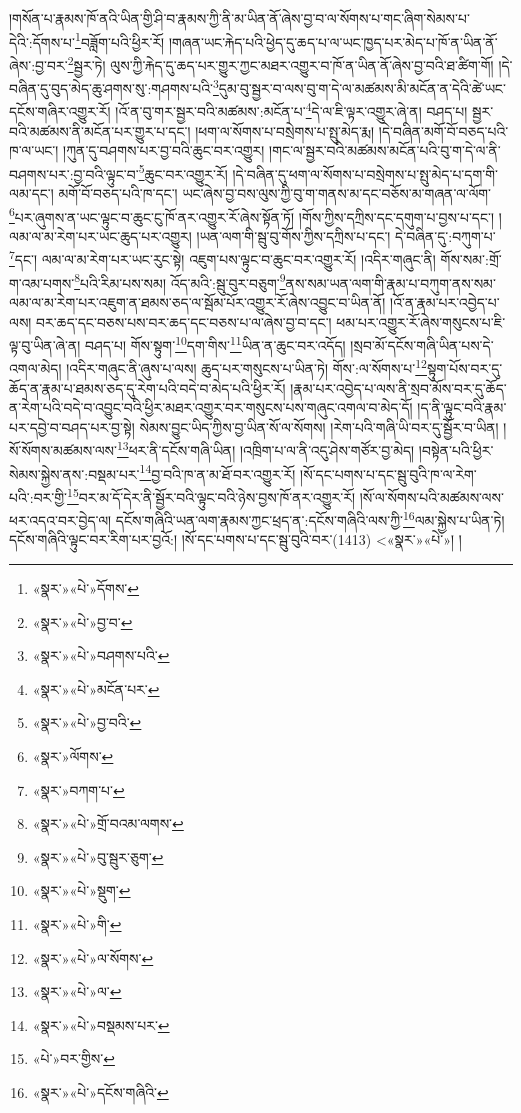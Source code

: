 །གསོན་པ་རྣམས་ཁོ་ནའི་ཡིན་གྱི་ཤི་བ་རྣམས་ཀྱི་ནི་མ་ཡིན་ནོ་ཞེས་བྱ་བ་ལ་སོགས་པ་གང་ཞིག་སེམས་པ་དེའི་:དོགས་པ་\footnote{«སྣར་»«པེ་»དོགས་}བཟློག་པའི་ཕྱིར་རོ། །གཞན་ཡང་རྐེད་པའི་ཕྱེད་དུ་ཆད་པ་ལ་ཡང་ཁྱད་པར་མེད་པ་ཁོ་ན་ཡིན་ནོ་ཞེས་:བྱ་བར་\footnote{«སྣར་»«པེ་»བྱ་བ་}སྦྱར་ཏེ། ལུས་ཀྱི་རྐེད་དུ་ཆད་པར་གྱུར་ཀྱང་མཐར་འགྱུར་བ་ཁོ་ན་ཡིན་ནོ་ཞེས་བྱ་བའི་ཐ་ཚིག་གོ། །དེ་བཞིན་དུ་བུད་མེད་ཆུ་ཤགས་སུ་:གཤགས་པའི་\footnote{«སྣར་»«པེ་»བཤགས་པའི་}དུམ་བུ་སྦྱར་བ་ལས་བུ་ག་དེ་ལ་མཚམས་མི་མངོན་ན་དེའི་ཚེ་ཡང་དངོས་གཞིར་འགྱུར་རོ། །འོ་ན་བུ་གར་སྦྱར་བའི་མཚམས་:མངོན་པ་\footnote{«སྣར་»«པེ་»མངོན་པར་}དེ་ལ་ཇི་ལྟར་འགྱུར་ཞེ་ན། བཤད་པ། སྦྱར་བའི་མཚམས་ནི་མངོན་པར་གྱུར་པ་དང་། །ཕག་ལ་སོགས་པ་བསྲེགས་པ་སྤུ་མེད་རྨ། །དེ་བཞིན་མགོ་བོ་བཅད་པའི་ཁ་ལ་ཡང་། །ཀུན་དུ་བཤགས་པར་བྱ་བའི་ཆུང་བར་འགྱུར། །གང་ལ་སྦྱར་བའི་མཚམས་མངོན་པའི་བུ་ག་དེ་ལ་ནི་བཤགས་པར་:བྱ་བའི་ལྟུང་བ་\footnote{«སྣར་»«པེ་»བྱ་བའི་}ཆུང་བར་འགྱུར་རོ། །དེ་བཞིན་དུ་ཕག་ལ་སོགས་པ་བསྲེགས་པ་སྤུ་མེད་པ་དག་གི་ལམ་དང་། མགོ་བོ་བཅད་པའི་ཁ་དང་། ཡང་ཞེས་བྱ་བས་ལུས་ཀྱི་བུ་ག་གནས་མ་དང་བཅོས་མ་གཞན་ལ་ལོག་\footnote{«སྣར་»ལོགས་}པར་ཞུགས་ན་ཡང་ལྟུང་བ་ཆུང་ངུ་ཁོ་ནར་འགྱུར་རོ་ཞེས་སྟོན་ཏོ། །གོས་ཀྱིས་དཀྲིས་དང་དགུག་པ་བྱས་པ་དང་། །ལམ་ལ་མ་རེག་པར་ཡང་ཆུད་པར་འགྱུར། །ཡན་ལག་གི་སྦུ་བུ་གོས་ཀྱིས་དཀྲིས་པ་དང་། དེ་བཞིན་དུ་:བཀུག་པ་\footnote{«སྣར་»བཀག་པ་}དང་། ལམ་ལ་མ་རེག་པར་ཡང་རུང་སྟེ། འཇུག་པས་ལྟུང་བ་ཆུང་བར་འགྱུར་རོ། །འདིར་གཞུང་ནི། གོས་སམ་:གྲོ་ག་འམ་པགས་\footnote{«སྣར་»«པེ་»གྲོ་བའམ་ལགས་}པའི་རིམ་པས་སམ། འོད་མའི་:སྦུ་བུར་བཅུག་\footnote{«སྣར་»«པེ་»བུ་སྦུར་ཅུག་}ནས་སམ་ཡན་ལག་གི་རྣམ་པ་བཀུག་ནས་སམ་ལམ་ལ་མ་རེག་པར་འཇུག་ན་ཐམས་ཅད་ལ་སྦོམ་པོར་འགྱུར་རོ་ཞེས་འབྱུང་བ་ཡིན་ནོ། །འོ་ན་རྣམ་པར་འབྱེད་པ་ལས། བར་ཆད་དང་བཅས་པས་བར་ཆད་དང་བཅས་པ་ལ་ཞེས་བྱ་བ་དང་། ཕམ་པར་འགྱུར་རོ་ཞེས་གསུངས་པ་ཇི་ལྟ་བུ་ཡིན་ཞེ་ན། བཤད་པ། གོས་སྟུག་\footnote{«སྣར་»«པེ་»སྡུག་}དག་གིས་\footnote{«སྣར་»«པེ་»གི་}ཡིན་ན་ཆུང་བར་འདོད། །སྲབ་མོ་དངོས་གཞི་ཡིན་པས་དེ་འགལ་མེད། །འདིར་གཞུང་ནི་ཞུས་པ་ལས། ཆུད་པར་གསུངས་པ་ཡིན་ཏེ། གོས་:ལ་སོགས་པ་\footnote{«སྣར་»«པེ་»ལ་སོགས་}སྟུག་པོས་བར་དུ་ཆོད་ན་རྣམ་པ་ཐམས་ཅད་དུ་རེག་པའི་བདེ་བ་མེད་པའི་ཕྱིར་རོ། །རྣམ་པར་འབྱེད་པ་ལས་ནི་སྲབ་མོས་བར་དུ་ཆོད་ན་རེག་པའི་བདེ་བ་འབྱུང་བའི་ཕྱིར་མཐར་འགྱུར་བར་གསུངས་པས་གཞུང་འགལ་བ་མེད་དོ། །ད་ནི་ལྟུང་བའི་རྣམ་པར་དབྱེ་བ་བཤད་པར་བྱ་སྟེ། སེམས་བྱུང་ཡིད་ཀྱིས་བྱ་ཡིན་སོ་ལ་སོགས། །རེག་པའི་གཞི་ཡི་བར་དུ་སྦྱོར་བ་ཡིན། །སོ་སོགས་མཚམས་ལས་\footnote{«སྣར་»«པེ་»ལ་}ཕར་ནི་དངོས་གཞི་ཡིན། །འཁྲིག་པ་ལ་ནི་འདུ་ཤེས་གཙོར་བྱ་མེད། །བསྟེན་པའི་ཕྱིར་སེམས་སྐྱེས་ནས་:བསྡམ་པར་\footnote{«སྣར་»«པེ་»བསྡམས་པར་}བྱ་བའི་ཁ་ན་མ་ཐོ་བར་འགྱུར་རོ། །སོ་དང་པགས་པ་དང་སྦུ་བུའི་ཁ་ལ་རེག་པའི་:བར་གྱི་\footnote{«པེ་»བར་གྱིས་}བར་མ་དོ་དེར་ནི་སྦྱོར་བའི་ལྟུང་བའི་ཉེས་བྱས་ཁོ་ནར་འགྱུར་རོ། །སོ་ལ་སོགས་པའི་མཚམས་ལས་ཕར་འདའ་བར་བྱེད་ལ། དངོས་གཞིའི་ཡན་ལག་རྣམས་ཀྱང་ཕྲད་ན་:དངོས་གཞིའི་ལས་ཀྱི་\footnote{«སྣར་»«པེ་»དངོས་གཞིའི་}ལམ་སྐྱེས་པ་ཡིན་ཏེ། དངོས་གཞིའི་ལྟུང་བར་རིག་པར་བྱའོ:། །སོ་དང་པགས་པ་དང་སྦུ་བུའི་བར་(1413) <«སྣར་»«པེ་»། །
